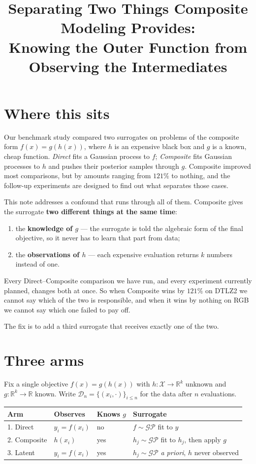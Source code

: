 \documentclass[11pt]{article}
\title{Separating Two Things Composite Modeling Provides:\\
Knowing the Outer Function from Observing the Intermediates}
\author{}
\date{}
\newcommand{\R}{\mathbb{R}}
\newcommand{\Xs}{\mathcal{X}}
\newcommand{\GP}{\mathcal{GP}}
\newcommand{\Data}{\mathcal{D}}
\begin{document}
\maketitle

\section{Where this sits}

Our benchmark study compared two surrogates on problems of the composite form
$f(x)=g(h(x))$, where $h$ is an expensive black box and $g$ is a known, cheap
function. \emph{Direct} fits a Gaussian process to $f$; \emph{Composite} fits
Gaussian processes to $h$ and pushes their posterior samples through $g$.
Composite improved most comparisons, but by amounts ranging from $121\%$ to
nothing, and the follow-up experiments are designed to find out what separates
those cases.

This note addresses a confound that runs through all of them. Composite gives
the surrogate \textbf{two different things at the same time}:

\begin{enumerate}
\item the \textbf{knowledge of $g$} --- the surrogate is told the algebraic form
of the final objective, so it never has to learn that part from data;
\item the \textbf{observations of $h$} --- each expensive evaluation returns
$k$ numbers instead of one.
\end{enumerate}

Every Direct--Composite comparison we have run, and every experiment currently
planned, changes both at once. So when Composite wins by $121\%$ on DTLZ2 we
cannot say which of the two is responsible, and when it wins by nothing on
RGB we cannot say which one failed to pay off.

The fix is to add a third surrogate that receives exactly one of the two.

\section{Three arms}

Fix a single objective $f(x)=g(h(x))$ with $h:\Xs\to\R^k$ unknown and
$g:\R^k\to\R$ known. Write $\Data_n=\{(x_i,\cdot)\}_{i\le n}$ for the data after
$n$ evaluations.

\begin{center}
\begin{tabular}{llll}
\toprule
Arm & Observes & Knows $g$ & Surrogate \\
\midrule
1. Direct    & $y_i=f(x_i)$ & no  & $f\sim\GP$ fit to $y$ \\
2. Composite & $h(x_i)$     & yes & $h_j\sim\GP$ fit to $h_j$, then apply $g$ \\
3. Latent    & $y_i=f(x_i)$ & yes & $h_j\sim\GP$ \emph{a priori}, $h$ never observed \\
\bottomrule
\end{tabular}
\end{center}
\end{document}
